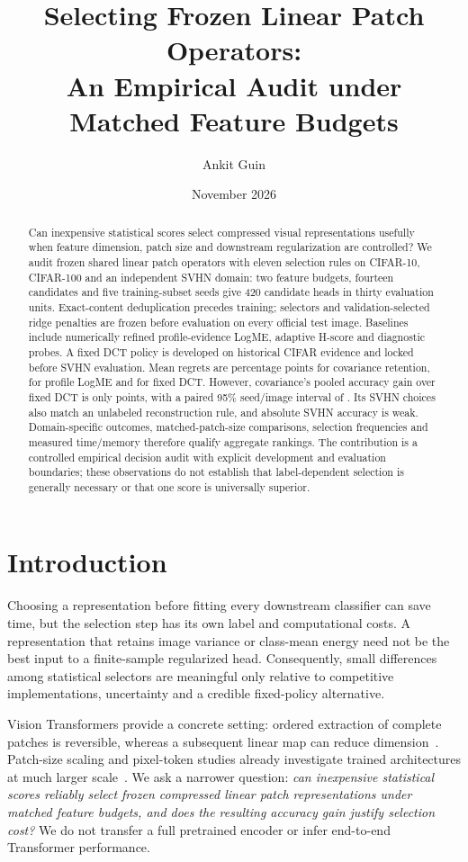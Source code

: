 \documentclass[11pt]{article}
\title{Selecting Frozen Linear Patch Operators:\\An Empirical Audit under Matched Feature Budgets}
\author{Ankit Guin}
\date{November 2026}
\begin{document}
\maketitle
\begin{abstract}
Can inexpensive statistical scores select compressed visual representations usefully when feature dimension, patch size and downstream regularization are controlled? We audit frozen shared linear patch operators with eleven selection rules on CIFAR-10, CIFAR-100 and an independent SVHN domain: two feature budgets, fourteen candidates and five training-subset seeds give 420 candidate heads in thirty evaluation units. Exact-content deduplication precedes training; selectors and validation-selected ridge penalties are frozen before evaluation on every official test image. Baselines include numerically refined profile-evidence LogME, adaptive H-score and diagnostic probes. A fixed DCT policy is developed on historical CIFAR evidence and locked before SVHN evaluation. Mean regrets are \RevCovRegret{} percentage points for covariance retention, \RevLogmeRegret{} for profile LogME and \RevFixedRegret{} for fixed DCT. However, covariance's pooled accuracy gain over fixed DCT is only \RevCovFixedGain{} points, with a paired 95\% seed/image interval of \RevCovFixedCI{}. Its SVHN choices also match an unlabeled reconstruction rule, and absolute SVHN accuracy is weak. Domain-specific outcomes, matched-patch-size comparisons, selection frequencies and measured time/memory therefore qualify aggregate rankings. The contribution is a controlled empirical decision audit with explicit development and evaluation boundaries; these observations do not establish that label-dependent selection is generally necessary or that one score is universally superior.
\end{abstract}

\section{Introduction}
Choosing a representation before fitting every downstream classifier can save time, but the selection step has its own label and computational costs. A representation that retains image variance or class-mean energy need not be the best input to a finite-sample regularized head. Consequently, small differences among statistical selectors are meaningful only relative to competitive implementations, uncertainty and a credible fixed-policy alternative.

Vision Transformers provide a concrete setting: ordered extraction of complete patches is reversible, whereas a subsequent linear map can reduce dimension~\citep{dosovitskiy2021vit}. Patch-size scaling and pixel-token studies already investigate trained architectures at much larger scale~\citep{wang2025scaling,nguyen2025pixels}. We ask a narrower question: \emph{can inexpensive statistical scores reliably select frozen compressed linear patch representations under matched feature budgets, and does the resulting accuracy gain justify selection cost?} We do not transfer a full pretrained encoder or infer end-to-end Transformer performance.
\end{document}
